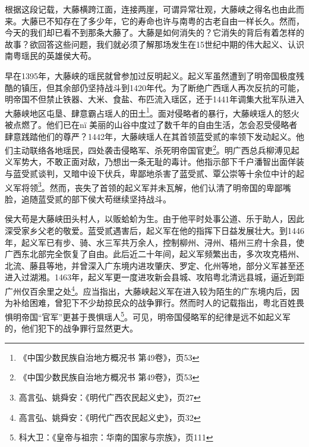 根据这段记载，大藤横跨江面，连接两崖，可谓异常壮观，大藤峡之得名也由此而来。大藤已不知存在了多少年，它的寿命也许与南粤的古老自由一样长久。然而，今天的我们却已看不到那条大藤了。大藤是如何消失的？它消失的背后有着怎样的故事？欲回答这些问题，我们就必须了解那场发生在15世纪中期的伟大起义、认识南粤瑶民的英雄侯大苟。

早在1395年，大藤峡的瑶民就曾参加过反明起义。起义军虽然遭到了明帝国极度残酷的镇压，但其余部仍坚持战斗到1420年代。为了断绝广西瑶人再次反抗的可能，明帝国不但禁止铁器、大米、食盐、布匹流入瑶区，还于1441年调集大批军队进入大藤峡地区屯垦、肆意霸占瑶人的田土\footnote{《中国少数民族自治地方概况书 第49卷》，页53}。面对侵略者的暴行，大藤峡瑶人的怒火被点燃了。他们已在nï 美丽的山谷中度过了数千年的自由生活，怎会忍受侵略者肆意践踏他们的尊严？1442年，大藤峡瑶人在其首领蓝受贰的率领下发动起义。他们主动联络各地瑶民，四处袭击侵略军、杀死明帝国官吏\footnote{《中国少数民族自治地方概况书 第49卷》，页53}。明广西总兵柳溥见起义军势大，不敢正面对敌，乃想出一条无耻的毒计。他指示部下千户潘智出面佯装与蓝受贰谈判，又暗中设下伏兵，卑鄙地杀害了蓝受贰、覃公崇等十余位中计的起义军将领\footnote{高言弘、姚舜安：《明代广西农民起义史》，页27}。然而，丧失了首领的起义军并未瓦解，他们认清了明帝国的卑鄙嘴脸，追随蓝受贰的部下侯大苟继续坚持战斗。

侯大苟是大藤峡田头村人，以贩蛤蚧为生。由于他平时处事公道、乐于助人，因此深受家乡父老的敬爱。蓝受贰遇害后，起义军在他的指挥下日益发展壮大。到1446年，起义军已有步、骑、水三军共万余人，控制柳州、浔州、梧州三府十余县，使广西东北部完全恢复了自由。此后近二十年间，起义军频繁出击，多次攻克梧州、北流、藤县等地，并曾深入广东境内进攻肇庆、罗定、化州等地，部分义军甚至还进入过湖湘。1463年，起义军更一度进攻新会县城、攻陷粤北清远县城，逼近到距广州仅百余里之处\footnote{高言弘、姚舜安：《明代广西农民起义史》，页32}。应当指出，大藤峡起义军在进入较为陌生的广东境内后，因为补给困难，曾犯下不少劫掠民众的战争罪行。然而时人的记载指出，粤北百姓畏惧明帝国“官军”更甚于畏惧瑶人\footnote{科大卫：《皇帝与祖宗：华南的国家与宗族》，页111}。可见，明帝国侵略军的纪律是远不如起义军的，他们犯下的战争罪行显然更大。

